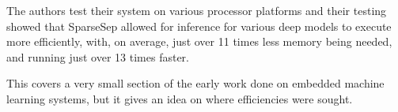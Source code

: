 \documentclass[conference]{IEEEtran}
\begin{document}
The authors test their system on various processor platforms and their testing showed that SparseSep allowed for inference for various deep models to execute more efficiently, with, on average, just over 11 times less memory being needed, and running just over 13 times faster.

This covers a very small section of the early work done on embedded machine learning systems, but it gives an idea on where efficiencies were sought.





\printbibliography
\vspace{12pt}
\end{document}

